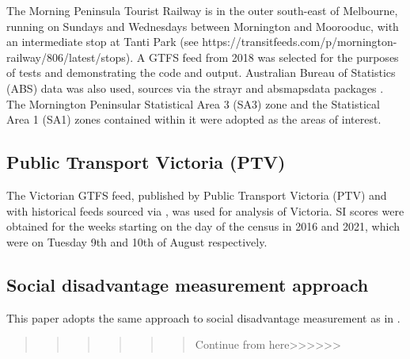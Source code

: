 \documentclass[preprint, 3p,
authoryear]{elsarticle} %
\begin{document}
The Morning Peninsula Tourist Railway is in the outer south-east of
Melbourne, running on Sundays and Wednesdays between Mornington and
Moorooduc, with an intermediate stop at Tanti Park (see
https://transitfeeds.com/p/mornington-railway/806/latest/stops). A GTFS
feed from 2018 was selected for the purposes of tests and demonstrating
the code and output. Australian Bureau of Statistics (ABS) data was also
used, sources via the strayr and absmapsdata packages \citep{r-strayr}.
The Mornington Peninsular Statistical Area 3 (SA3) zone and the
Statistical Area 1 (SA1) zones contained within it were adopted as the
areas of interest.

\hypertarget{public-transport-victoria-ptv}{%
\subsection{Public Transport Victoria
(PTV)}\label{public-transport-victoria-ptv}}

The Victorian GTFS feed, published by Public Transport Victoria (PTV)
and with historical feeds sourced via
\citet{transitfeeds_victoria:2023aa}, was used for analysis of Victoria.
SI scores were obtained for the weeks starting on the day of the census
in 2016 and 2021, which were on Tuesday 9th and 10th of August
respectively.

\hypertarget{social-disadvantage-measurement-approach}{%
\subsection{Social disadvantage measurement
approach}\label{social-disadvantage-measurement-approach}}

This paper adopts the same approach to social disadvantage measurement
as in \citet{currie2010identifying}.

\begin{quote}
\begin{quote}
\begin{quote}
\begin{quote}
\begin{quote}
\begin{quote}
Continue from
here\textgreater\textgreater\textgreater\textgreater\textgreater\textgreater{}
\end{quote}
\end{quote}
\end{quote}
\end{quote}
\end{quote}
\end{quote}
\end{document}
